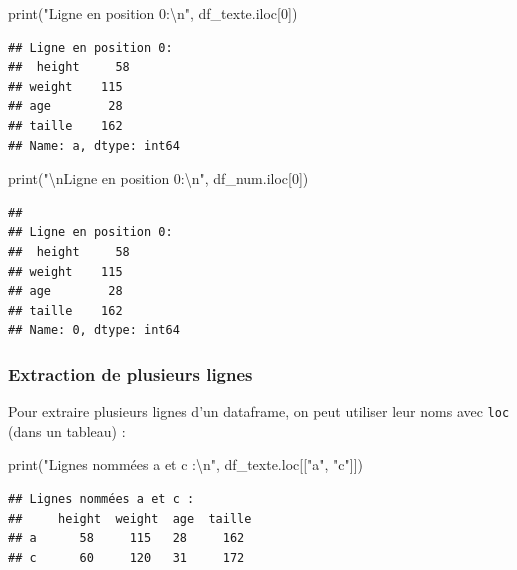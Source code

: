 \documentclass[
  12pt,
]{book}
\newenvironment{Shaded}{\begin{snugshade}}{\end{snugshade}}
\newcommand{\BuiltInTok}[1]{#1}
\newcommand{\CharTok}[1]{\textcolor[rgb]{0.31,0.60,0.02}{#1}}
\newcommand{\DecValTok}[1]{\textcolor[rgb]{0.00,0.00,0.81}{#1}}
\newcommand{\NormalTok}[1]{#1}
\newcommand{\StringTok}[1]{\textcolor[rgb]{0.31,0.60,0.02}{#1}}
\numberwithin{equation}{section}
\numberwithin{countremarque}{section}
\begin{document}
\begin{Shaded}
\begin{Highlighting}[]
\BuiltInTok{print}\NormalTok{(}\StringTok{"Ligne en position 0:}\CharTok{\textbackslash{}n}\StringTok{"}\NormalTok{, df\_texte.iloc[}\DecValTok{0}\NormalTok{])}
\end{Highlighting}
\end{Shaded}

\begin{lstlisting}
## Ligne en position 0:
##  height     58
## weight    115
## age        28
## taille    162
## Name: a, dtype: int64
\end{lstlisting}

\begin{Shaded}
\begin{Highlighting}[]
\BuiltInTok{print}\NormalTok{(}\StringTok{"}\CharTok{\textbackslash{}n}\StringTok{Ligne en position 0:}\CharTok{\textbackslash{}n}\StringTok{"}\NormalTok{, df\_num.iloc[}\DecValTok{0}\NormalTok{])}
\end{Highlighting}
\end{Shaded}

\begin{lstlisting}
## 
## Ligne en position 0:
##  height     58
## weight    115
## age        28
## taille    162
## Name: 0, dtype: int64
\end{lstlisting}

\subsubsection{Extraction de plusieurs lignes}\label{extraction-de-plusieurs-lignes}

Pour extraire plusieurs lignes d'un dataframe, on peut utiliser leur noms avec \texttt{loc} (dans un tableau) :

\begin{Shaded}
\begin{Highlighting}[]
\BuiltInTok{print}\NormalTok{(}\StringTok{"Lignes nommées a et c :}\CharTok{\textbackslash{}n}\StringTok{"}\NormalTok{, df\_texte.loc[[}\StringTok{"a"}\NormalTok{, }\StringTok{"c"}\NormalTok{]])}
\end{Highlighting}
\end{Shaded}

\begin{lstlisting}
## Lignes nommées a et c :
##     height  weight  age  taille
## a      58     115   28     162
## c      60     120   31     172
\end{lstlisting}
\end{document}
